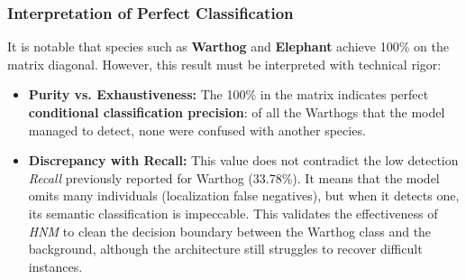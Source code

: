 %
%

\subsubsection{Interpretation of Perfect Classification}
It is notable that species such as \textbf{Warthog} and \textbf{Elephant} achieve 100\% on the matrix diagonal. However, this result must be interpreted with technical rigor:

\begin{itemize}
    \item \textbf{Purity vs. Exhaustiveness:} The 100\% in the matrix indicates perfect \textbf{conditional classification precision}: of all the Warthogs that the model managed to detect, none were confused with another species.
    \item \textbf{Discrepancy with Recall:} This value does not contradict the low detection \textit{Recall} previously reported for Warthog (33.78\%). It means that the model omits many individuals (localization false negatives), but when it detects one, its semantic classification is impeccable. This validates the effectiveness of \textit{HNM} to clean the decision boundary between the Warthog class and the background, although the architecture still struggles to recover difficult instances.
\end{itemize}

